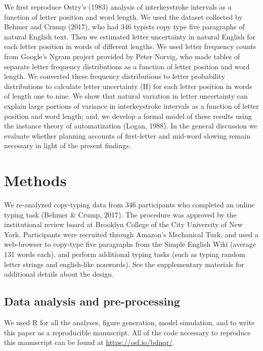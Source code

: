 \documentclass[,man,floatsintext]{apa6}
\begin{document}
We first reproduce Ostry's (1983) analysis of interkeystroke intervals as a function of letter position and word length. We used the dataset collected by Behmer and Crump (2017), who had 346 typists copy type five paragraphs of natural English text. Then we estimated letter uncertainty in natural English for each letter position in words of different lengths. We used letter frequency counts from Google's Ngram project provided by Peter Norvig, who made tables of separate letter frequency distributions as a function of letter position and word length. We converted these frequency distributions to letter probability distributions to calculate letter uncertainty (H) for each letter position in words of length one to nine. We show that natural variation in letter uncertainty can explain large portions of variance in interkeystroke intervals as a function of letter position and word length; and, we develop a formal model of these results using the instance theory of automatization (Logan, 1988). In the general discussion we evaluate whether planning accounts of first-letter and mid-word slowing remain necessary in light of the present findings.

\hypertarget{methods}{%
\section{Methods}\label{methods}}

We re-analyzed copy-typing data from 346 participants who completed an online typing task (Behmer \& Crump, 2017). The procedure was approved by the institutional review board at Brooklyn College of the City University of New York. Participants were recruited through Amazon's Mechanical Turk, and used a web-browser to copy-type five paragraphs from the Simple English Wiki (average 131 words each), and perform additional typing tasks (such as typing random letter strings and english-like nonwords). See the supplementary materials for additional details about the design.

\hypertarget{data-analysis-and-pre-processing}{%
\subsection{Data analysis and pre-processing}\label{data-analysis-and-pre-processing}}

We used R for all the analyses, figure generation, model simulation, and to write this paper as a reproducible manuscript. All of the code necessary to reproduce this manuscript can be found at \url{https://osf.io/bdnqr/}.
\end{document}
